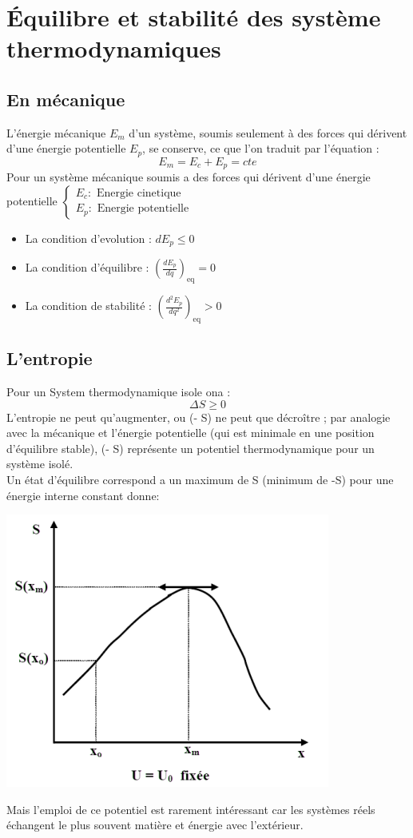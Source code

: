 \documentclass[12pt,oneside]{book}
\begin{document}
\chapter{Équilibre et stabilité des système thermodynamiques}
\section{En mécanique}
L'énergie mécanique $E_m$ d'un système, soumis seulement à des forces qui dérivent d'une énergie potentielle $E_p$, se conserve, ce que l'on traduit par l'équation :
\[ E_m = E_c + E_p = cte \]
Pour un système mécanique soumis a des forces qui dérivent d'une énergie potentielle $\begin{cases}
        E_c : \text{ Energie cinetique } \\
        E_p : \text{ Energie potentielle }
    \end{cases}$
\begin{itemize}
    \item La condition d'evolution : $dE_p \leq 0$
    \item La condition d’équilibre : $(\frac{dE_p}{dq})_\text{eq} = 0$
    \item La condition de stabilité : $(\frac{d^2E_p}{dq^2})_\text{eq} > 0$
\end{itemize}
\section{L'entropie}
Pour un System thermodynamique isole ona :
\[ \Delta S \geq 0 \]
L'entropie ne peut qu'augmenter, ou (- S) ne peut que décroître ; par analogie avec la mécanique et l'énergie potentielle (qui est minimale en une position d'équilibre stable), (- S) représente un potentiel thermodynamique pour un système isolé.\\
Un état d’équilibre correspond a un maximum de S (minimum de -S) pour une énergie interne constant donne:
\begin{center}
    \includegraphics[width=0.5\linewidth]{../pic/3300/8.png}
\end{center}
Mais l'emploi de ce potentiel est rarement intéressant car les systèmes réels échangent le plus souvent matière et énergie avec l'extérieur.
\end{document}
